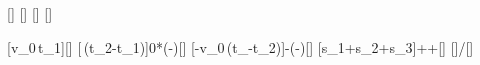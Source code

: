 [\mps]
[\s]
[\s]
[\s]

[v_0\,t_1]{\vNullX*\tOneX}[\m]
[\,(t_2-t_1)]{0*(\tTwoX-\tOneX)}[\m]
[-v_0\,(t_-t_2)]{-\vNullX*(\tEX-\tTwoX)}[\m]
[\Delta s_1+\Delta s_2+\Delta s_3]{\dOneX+\dTwoX+\dThreeX}[\m]
[]{\dsX/\tEX}[\mps]

